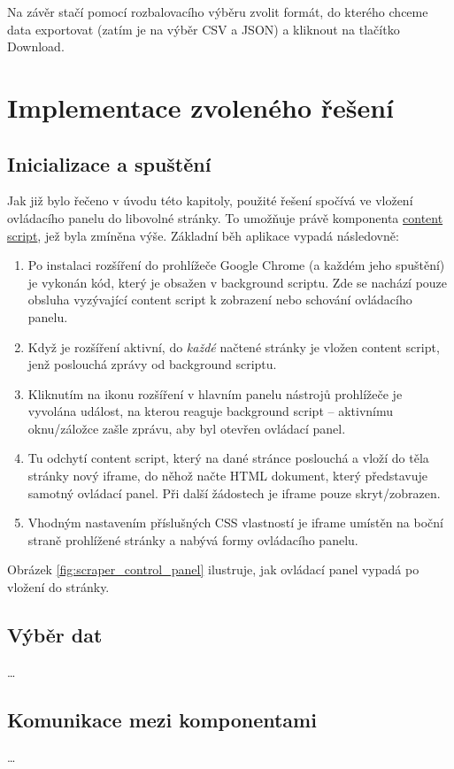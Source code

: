 \documentclass[thesis=B,czech]{FITthesis2}[2012/06/26]
\begin{document}
	Na závěr stačí pomocí rozbalovacího výběru zvolit formát, do kterého chceme data exportovat (zatím je na výběr CSV a JSON) a kliknout na tlačítko \textsf{Download}.
	
	\section{Implementace zvoleného řešení}
	\subsection{Inicializace a spuštění}
	Jak již bylo řečeno v úvodu této kapitoly, použité řešení spočívá ve vložení ovládacího panelu do libovolné stránky. To umožňuje právě komponenta \hyperref[def:content_script]{content script}, jež byla zmíněna výše. Základní běh aplikace vypadá následovně:
	\begin{enumerate}
		\item Po instalaci rozšíření do prohlížeče Google Chrome (a každém jeho spuštění) je vykonán kód, který je obsažen v background scriptu. Zde se nachází pouze obsluha vyzývající content script k zobrazení nebo schování ovládacího panelu.
		\item Když je rozšíření aktivní, do \emph{každé} načtené stránky je vložen content script, jenž poslouchá zprávy od background scriptu.
		\item Kliknutím na ikonu rozšíření v hlavním panelu nástrojů prohlížeče je vyvolána událost, na kterou reaguje background script -- aktivnímu oknu/záložce zašle zprávu, aby byl otevřen ovládací panel. 
		\item Tu odchytí content script, který na dané stránce poslouchá a vloží do těla stránky nový iframe, do něhož načte HTML dokument, který představuje samotný ovládací panel. Při další žádostech je iframe pouze skryt/zobrazen.
		\item Vhodným nastavením příslušných CSS vlastností je iframe umístěn na boční straně prohlížené stránky a nabývá formy ovládacího panelu. 
	\end{enumerate}
	Obrázek \ref{fig:scraper_control_panel} ilustruje, jak ovládací panel vypadá po vložení do stránky.

	\subsection{Výběr dat}
	\dots
	
	\subsection{Komunikace mezi komponentami}
	\dots
	
\end{document}
